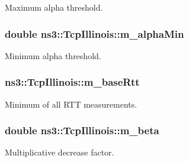 Maximum alpha threshold. 

\subsubsection[{\texorpdfstring{m\+\_\+alpha\+Min}{m_alphaMin}}]{\setlength{\rightskip}{0pt plus 5cm}double ns3\+::\+Tcp\+Illinois\+::m\+\_\+alpha\+Min\hspace{0.3cm}{\ttfamily [private]}}\hypertarget{classns3_1_1TcpIllinois_a5762b0230b8817d99f8b52cabe27c6fc}{}\label{classns3_1_1TcpIllinois_a5762b0230b8817d99f8b52cabe27c6fc}


Minimum alpha threshold. 

\subsubsection[{\texorpdfstring{m\+\_\+base\+Rtt}{m_baseRtt}}]{ ns3\+::\+Tcp\+Illinois\+::m\+\_\+base\+Rtt\hspace{0.3cm}{\ttfamily [private]}}\hypertarget{classns3_1_1TcpIllinois_a50fb2e63ddbc6291c27c6360f871ec9f}{}\label{classns3_1_1TcpIllinois_a50fb2e63ddbc6291c27c6360f871ec9f}


Minimum of all R\+TT measurements. 

\subsubsection[{\texorpdfstring{m\+\_\+beta}{m_beta}}]{\setlength{\rightskip}{0pt plus 5cm}double ns3\+::\+Tcp\+Illinois\+::m\+\_\+beta\hspace{0.3cm}{\ttfamily [private]}}\hypertarget{classns3_1_1TcpIllinois_a0d605879dbf76bb97647d9e993e78a59}{}\label{classns3_1_1TcpIllinois_a0d605879dbf76bb97647d9e993e78a59}


Multiplicative decrease factor. 

